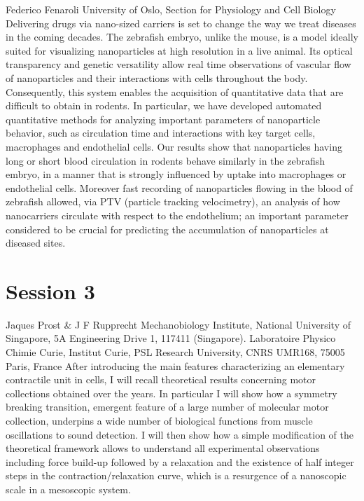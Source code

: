 \documentclass{article}
\begin{document}
{Federico Fenaroli}
{University of Oslo, Section for Physiology and Cell Biology}
{Delivering drugs via nano-sized carriers is set to change the way we treat diseases in the coming decades.
The zebrafish embryo, unlike the mouse, is a model ideally suited for visualizing nanoparticles at high
resolution in a live animal. Its optical transparency and genetic versatility allow real time observations of
vascular flow of nanoparticles and their interactions with cells throughout the body. Consequently, this
system enables the acquisition of quantitative data that are difficult to obtain in rodents. In particular, we
have developed automated quantitative methods for analyzing important parameters of nanoparticle behavior,
such as circulation time and interactions with key target cells, macrophages and endothelial cells. Our
results show that nanoparticles having long or short blood circulation in rodents behave similarly in the
zebrafish embryo, in a manner that is strongly influenced by uptake into macrophages or endothelial cells.
Moreover fast recording of nanoparticles flowing in the blood of zebrafish allowed, via PTV
(particle tracking velocimetry), an analysis of how nanocarriers circulate with respect to the endothelium; an
important parameter considered to be crucial for predicting the accumulation of nanoparticles at diseased sites.  }

\newpage
\section*{Session 3}

{Jaques Prost \& J F Rupprecht}
{Mechanobiology Institute, National University of Singapore, 5A Engineering Drive 1, 117411 (Singapore).
Laboratoire Physico Chimie Curie, Institut Curie, PSL Research University, CNRS UMR168, 75005 Paris, France}
{After introducing the main features characterizing an elementary contractile unit in cells,
I will recall theoretical results concerning motor collections obtained over the years.
In particular I will show how a symmetry breaking transition, emergent feature of a large
number of molecular motor collection, underpins a wide number of biological functions from
muscle oscillations to sound detection.  I will then show how a simple modification of the
theoretical framework allows to understand all experimental observations including force
build-up followed by a relaxation and the existence of half integer steps in the
contraction/relaxation curve, which is a resurgence of a nanoscopic scale in a mesoscopic
system.}
\end{document}
